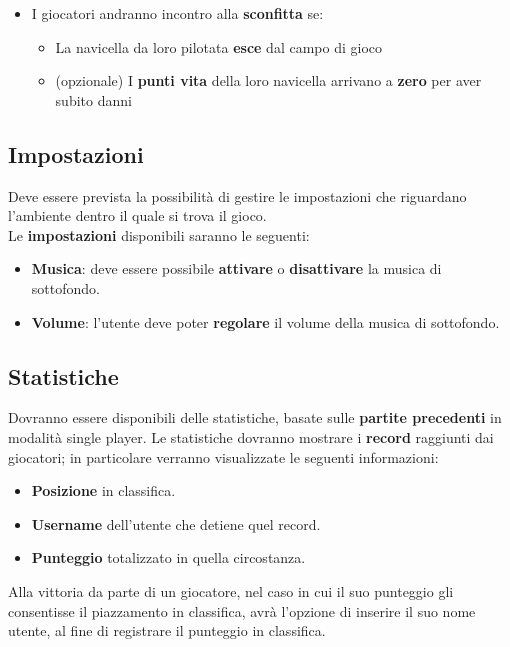 \begin{itemize}
\begin{itemize}
                     \item  I giocatori andranno incontro alla \textbf{sconfitta} se:
                        \begin{itemize}
                            \item La navicella da loro pilotata \textbf{esce} dal campo di gioco
                            \item (opzionale) I \textbf{punti vita} della loro navicella arrivano a \textbf{
    zero} per aver subito danni
                        \end{itemize}
                \end{itemize}
            \end{itemize}
        
        \subsection{Impostazioni}
            Deve essere prevista la possibilità di gestire le impostazioni che riguardano l'ambiente dentro il quale si trova il gioco.\\
            Le \textbf{impostazioni} disponibili saranno le seguenti:
            \begin{itemize}
                \item \textbf{Musica}: deve essere possibile \textbf{attivare} o \textbf{disattivare} la musica di sottofondo.
                \item \textbf{Volume}: l'utente deve poter \textbf{regolare} il volume della musica di sottofondo.
            \end{itemize}
            
        \subsection{Statistiche}    
            Dovranno essere disponibili delle statistiche, basate sulle \textbf{partite precedenti} in modalità single player.
            Le statistiche dovranno mostrare i \textbf{record} raggiunti dai giocatori; in particolare verranno visualizzate le seguenti informazioni: 
            \begin{itemize}
                \item \textbf{Posizione} in classifica.
                \item \textbf{Username} dell'utente che detiene quel record.
                \item \textbf{Punteggio} totalizzato in quella circostanza.
            \end{itemize}
            Alla vittoria da parte di un giocatore, nel caso in cui il suo punteggio gli consentisse il piazzamento in classifica, avrà l'opzione di inserire il suo nome utente, al fine di registrare il punteggio in classifica.

